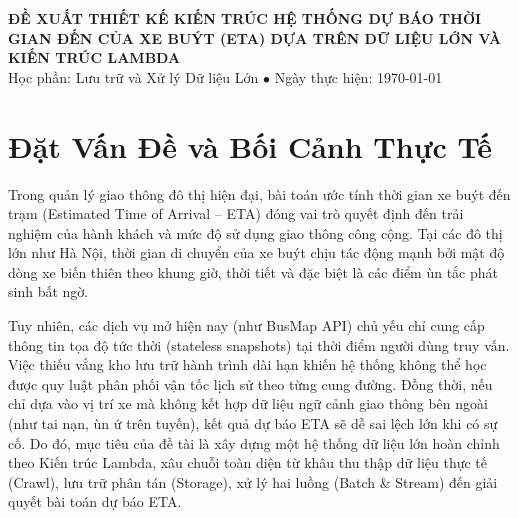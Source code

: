 \documentclass[11pt,a4paper]{article}
\begin{document}
\begin{center}
{\large \textbf{ĐỀ XUẤT THIẾT KẾ KIẾN TRÚC HỆ THỐNG DỰ BÁO THỜI GIAN ĐẾN CỦA XE BUÝT (ETA) DỰA TRÊN DỮ LIỆU LỚN VÀ KIẾN TRÚC LAMBDA}}\\[3pt]
{\small Học phần: Lưu trữ và Xử lý Dữ liệu Lớn \quad $\bullet$ \quad Ngày thực hiện: \today}
\end{center}
\vspace{-4pt}

\section{Đặt Vấn Đề và Bối Cảnh Thực Tế}
Trong quản lý giao thông đô thị hiện đại, bài toán ước tính thời gian xe buýt đến trạm (Estimated Time of Arrival -- ETA) đóng vai trò quyết định đến trải nghiệm của hành khách và mức độ sử dụng giao thông công cộng. Tại các đô thị lớn như Hà Nội, thời gian di chuyển của xe buýt chịu tác động mạnh bởi mật độ dòng xe biến thiên theo khung giờ, thời tiết và đặc biệt là các điểm ùn tắc phát sinh bất ngờ.

Tuy nhiên, các dịch vụ mở hiện nay (như BusMap API) chủ yếu chỉ cung cấp thông tin tọa độ tức thời (stateless snapshots) tại thời điểm người dùng truy vấn. Việc thiếu vắng kho lưu trữ hành trình dài hạn khiến hệ thống không thể học được quy luật phân phối vận tốc lịch sử theo từng cung đường. Đồng thời, nếu chỉ dựa vào vị trí xe mà không kết hợp dữ liệu ngữ cảnh giao thông bên ngoài (như tai nạn, ùn ứ trên tuyến), kết quả dự báo ETA sẽ dễ sai lệch lớn khi có sự cố. Do đó, mục tiêu của đề tài là xây dựng một hệ thống dữ liệu lớn hoàn chỉnh theo Kiến trúc Lambda, xâu chuỗi toàn diện từ khâu thu thập dữ liệu thực tế (Crawl), lưu trữ phân tán (Storage), xử lý hai luồng (Batch \& Stream) đến giải quyết bài toán dự báo ETA.
\end{document}
